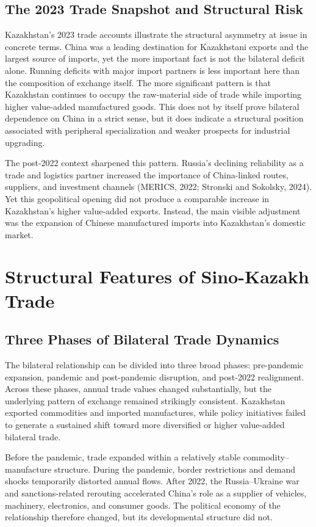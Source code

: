 \documentclass[12pt]{article}
\begin{document}
\subsection{The 2023 Trade Snapshot and Structural Risk}

Kazakhstan's 2023 trade accounts illustrate the structural asymmetry at issue in concrete terms. China was a leading destination for Kazakhstani exports and the largest source of imports, yet the more important fact is not the bilateral deficit alone. Running deficits with major import partners is less important here than the composition of exchange itself. The more significant pattern is that Kazakhstan continues to occupy the raw-material side of trade while importing higher value-added manufactured goods. This does not by itself prove bilateral dependence on China in a strict sense, but it does indicate a structural position associated with peripheral specialization and weaker prospects for industrial upgrading.

The post-2022 context sharpened this pattern. Russia's declining reliability as a trade and logistics partner increased the importance of China-linked routes, suppliers, and investment channels (MERICS, 2022; Stronski and Sokolsky, 2024). Yet this geopolitical opening did not produce a comparable increase in Kazakhstan's higher value-added exports. Instead, the main visible adjustment was the expansion of Chinese manufactured imports into Kazakhstan's domestic market.

\section{Structural Features of Sino-Kazakh Trade}

\subsection{Three Phases of Bilateral Trade Dynamics}

The bilateral relationship can be divided into three broad phases: pre-pandemic expansion, pandemic and post-pandemic disruption, and post-2022 realignment. Across these phases, annual trade values changed substantially, but the underlying pattern of exchange remained strikingly consistent. Kazakhstan exported commodities and imported manufactures, while policy initiatives failed to generate a sustained shift toward more diversified or higher value-added bilateral trade.

Before the pandemic, trade expanded within a relatively stable commodity--manufacture structure. During the pandemic, border restrictions and demand shocks temporarily distorted annual flows. After 2022, the Russia--Ukraine war and sanctions-related rerouting accelerated China's role as a supplier of vehicles, machinery, electronics, and consumer goods. The political economy of the relationship therefore changed, but its developmental structure did not.
\end{document}
